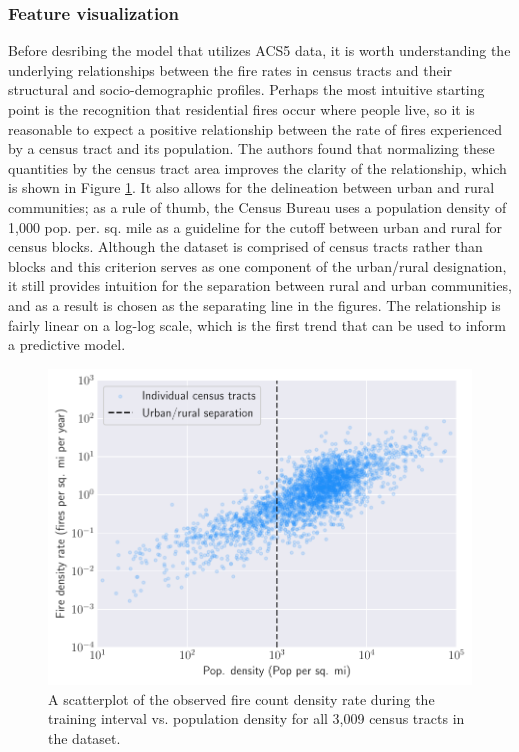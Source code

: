 \documentclass{svjour3}
\begin{document}
  \subsubsection{Feature visualization}
  Before desribing the model that utilizes ACS5 data, it is worth understanding the underlying relationships between the fire rates in census tracts and their structural and socio-demographic profiles. Perhaps the most intuitive starting point is the recognition that residential fires occur where people live, so it is reasonable to expect a positive relationship between the rate of fires experienced by a census tract and its population. The authors found that normalizing these quantities by the census tract area improves the clarity of the relationship, which is shown in Figure \ref{fig:pop_relation}. It also allows for the delineation between urban and rural communities; as a rule of thumb, the Census Bureau   \cite{ratcliffe2016defining} uses a population density of 1,000 pop. per. sq. mile as a guideline for the cutoff between urban and rural for census blocks. Although the dataset is comprised of census tracts rather than blocks and this criterion serves as one component of the urban/rural designation, it still provides intuition for the separation between rural and urban communities, and as a result is chosen as the separating line in the figures. The relationship is fairly linear on a log-log scale, which is the first trend that can be used to inform a predictive model.
    
     \begin{figure}[htb] \centering
    \includegraphics[width=.75\textwidth]{figures/pop_relation.pdf}
    \caption{A scatterplot of the observed fire count density rate   during the training interval vs. population density for all 3,009 census tracts in the dataset. }
    \label{fig:pop_relation}
    \end{figure}
  
\end{document}
